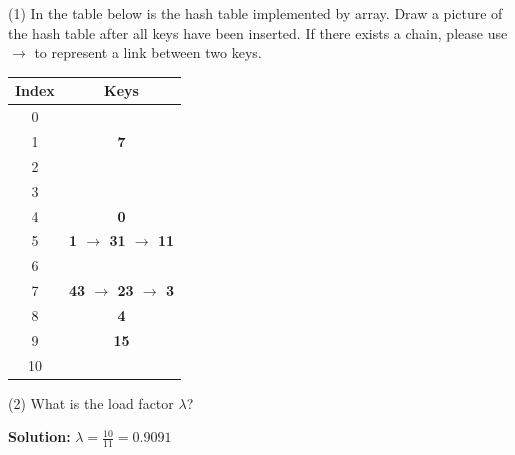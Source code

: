 \documentclass{article}
\begin{document}
(1) In the table below is the hash table implemented by array. Draw a picture of the hash table after all keys have been inserted. If there exists a chain, please use $\rightarrow$ to represent a link between two keys.
\\
\linespread{2.27}
\setlength{\tabcolsep}{10pt}
\begin{table}[hp]

	\begin{tabular}{|c|c|}
		\hline
		\textbf{Index} & \textbf{Keys} \\ \hline
		0     & \\ \hline
		1     &\textbf{7}\\ \hline
		2     &\\ \hline
		3     &\\ \hline
		4     &\textbf{0}\\ \hline
		5     &\textbf{1 $\rightarrow$ 31 $\rightarrow$ 11}\\ \hline
		6     &\\ \hline
		7     &\textbf{43 $\rightarrow$ 23 $\rightarrow$ 3}\\ \hline
		8     &\textbf{4}\\ \hline
		9     &\textbf{15}\\ \hline
		10    &\\ \hline
	
	\end{tabular}
\end{table}

(2) What is the load factor $\lambda$?\\
\par\textbf{Solution:} $\lambda = \frac{10}{11} = 0.9091$
\end{document}
